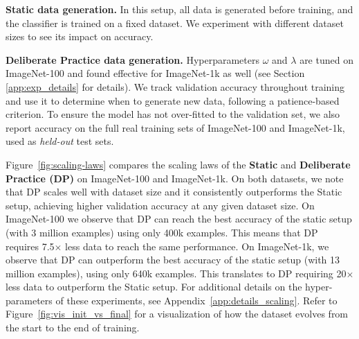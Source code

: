 \textbf{Static data generation.} 
In this setup, all data is generated before training, and the classifier is trained on a fixed dataset. We experiment with different dataset sizes to see its impact on accuracy.

\textbf{Deliberate Practice data generation.}
Hyperparameters \(\omega\) and \(\lambda\) are tuned on ImageNet-100 and found effective for ImageNet-1k as well (see Section \ref{app:exp_details} for details). We track validation accuracy throughout training and use it to determine when to generate new data, following a patience-based criterion. To ensure the model has not over-fitted to the validation set, we also report accuracy on the full real training sets of ImageNet-100 and ImageNet-1k, used as \textit{held-out} test sets.

Figure~\ref{fig:scaling-laws} compares the scaling laws of the  \textbf{Static} and \textbf{Deliberate Practice (DP)} on ImageNet-100 and ImageNet-1k. On both datasets, we note that DP scales well with dataset size and it consistently outperforms the Static setup, achieving higher validation accuracy at any given dataset size. On ImageNet-100 we observe that DP can reach the best accuracy of the static setup (with 3 million examples) using only 400k examples. This means that DP requires 7.5$\times$ less data to reach the same performance. On ImageNet-1k, we observe that DP can outperform the best accuracy of the static setup (with 13 million examples), using only 640k examples. This translates to DP requiring 20$\times$ less data to outperform the Static setup. For additional details on the hyper-parameters of these experiments, see Appendix~\ref{app:details_scaling}. Refer to Figure~\ref{fig:vis_init_vs_final} for a visualization of how the dataset evolves from the start to the end of training.

